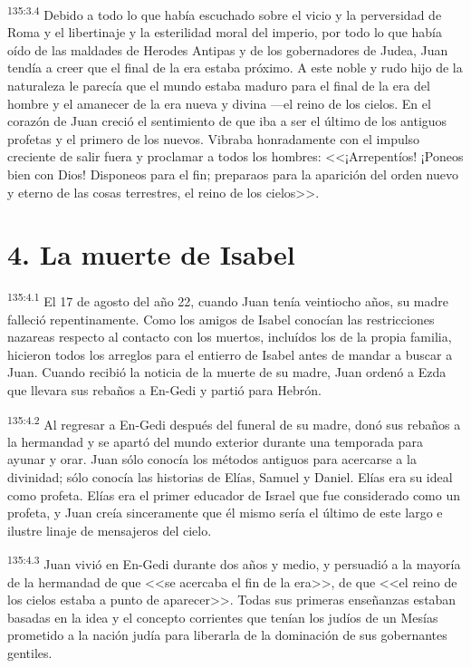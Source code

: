\par 
\textsuperscript{135:3.4} Debido a todo lo que había escuchado sobre el vicio y la perversidad de Roma y el libertinaje y la esterilidad moral del imperio, por todo lo que había oído de las maldades de Herodes Antipas y de los gobernadores de Judea, Juan tendía a creer que el final de la era estaba próximo. A este noble y rudo hijo de la naturaleza le parecía que el mundo estaba maduro para el final de la era del hombre y el amanecer de la era nueva y divina ---el reino de los cielos. En el corazón de Juan creció el sentimiento de que iba a ser el último de los antiguos profetas y el primero de los nuevos. Vibraba honradamente con el impulso creciente de salir fuera y proclamar a todos los hombres: <<¡Arrepentíos! ¡Poneos bien con Dios! Disponeos para el fin; preparaos para la aparición del orden nuevo y eterno de las cosas terrestres, el reino de los cielos>>.

\section*{4. La muerte de Isabel}
\par 
\textsuperscript{135:4.1} El 17 de agosto del año 22, cuando Juan tenía veintiocho años, su madre falleció repentinamente. Como los amigos de Isabel conocían las restricciones nazareas respecto al contacto con los muertos, incluídos los de la propia familia, hicieron todos los arreglos para el entierro de Isabel antes de mandar a buscar a Juan. Cuando recibió la noticia de la muerte de su madre, Juan ordenó a Ezda que llevara sus rebaños a En-Gedi y partió para Hebrón.

\par 
\textsuperscript{135:4.2} Al regresar a En-Gedi después del funeral de su madre, donó sus rebaños a la hermandad y se apartó del mundo exterior durante una temporada para ayunar y orar. Juan sólo conocía los métodos antiguos para acercarse a la divinidad; sólo conocía las historias de Elías, Samuel y Daniel. Elías era su ideal como profeta. Elías era el primer educador de Israel que fue considerado como un profeta, y Juan creía sinceramente que él mismo sería el último de este largo e ilustre linaje de mensajeros del cielo.

\par 
\textsuperscript{135:4.3} Juan vivió en En-Gedi durante dos años y medio, y persuadió a la mayoría de la hermandad de que <<se acercaba el fin de la era>>, de que <<el reino de los cielos estaba a punto de aparecer>>. Todas sus primeras enseñanzas estaban basadas en la idea y el concepto corrientes que tenían los judíos de un Mesías prometido a la nación judía para liberarla de la dominación de sus gobernantes gentiles.

